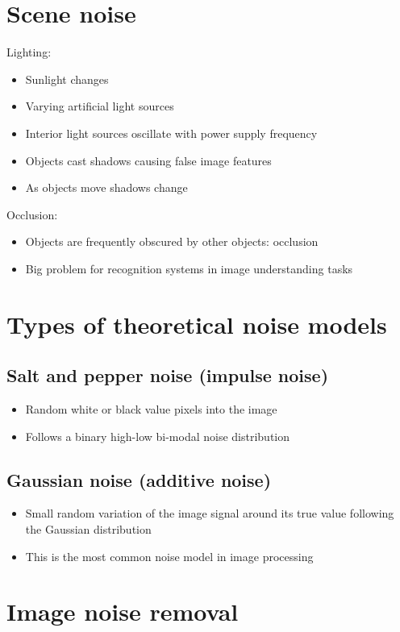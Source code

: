 \documentclass{article}[18pt]
\begin{document}
\section{Scene noise}
Lighting:\begin{itemize}
	\item Sunlight changes
	\item Varying artificial light sources
	\item Interior light sources oscillate with power supply frequency
	\item Objects cast shadows causing false image features
	\item As objects move shadows change
\end{itemize}
Occlusion:
\begin{itemize}
	\item Objects are frequently obscured by other objects: occlusion
	\item Big problem for recognition systems in image understanding tasks
\end{itemize}
\section{Types of theoretical noise models}
\subsection{Salt and pepper noise (impulse noise)}
\begin{itemize}
	\item Random white or black value pixels into the image
	\item Follows a binary high-low bi-modal noise distribution
\end{itemize}
\subsection{Gaussian noise (additive noise)}
\begin{itemize}
	\item Small random variation of the image signal around its true value following the Gaussian distribution
	\item This is the most common noise model in image processing
\end{itemize}
\section{Image noise removal}
\end{document}
